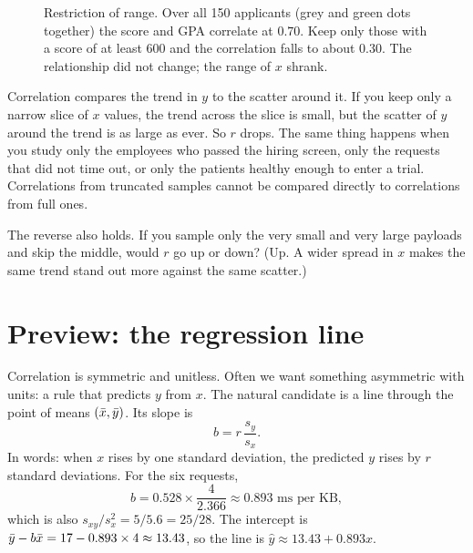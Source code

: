\begin{figure}[H]
\caption{Restriction of range. Over all 150 applicants (grey and green dots
together) the score and GPA correlate at $0.70$. Keep only those with a score of at least 600 and the correlation falls to
about $0.30$. The relationship did not change; the range of $x$ shrank.}
\label{fig:two-variables-range}
\end{figure}

Correlation compares the trend in $y$ to the scatter around it. If you keep only a
narrow slice of $x$ values, the trend across the slice is small, but the scatter
of $y$ around the trend is as large as ever. So $r$ drops. The same thing happens
when you study only the employees who passed the hiring screen, only the requests
that did not time out, or only the patients healthy enough to enter a trial.
Correlations from truncated samples cannot be compared directly to correlations
from full ones.

\begin{recoverybox}
The reverse also holds. If you sample only the very small and very large payloads
and skip the middle, would $r$ go up or down? (Up. A wider spread in $x$ makes the
same trend stand out more against the same scatter.)
\end{recoverybox}

\section{Preview: the regression line}
\label{sec:corr-regression-preview}

Correlation is symmetric and unitless. Often we want something asymmetric with
units: a rule that predicts $y$ from $x$. The natural candidate is a line through
the point of means $(\bar{x}, \bar{y})$. Its slope is
\[
  b = r \,\frac{s_y}{s_x}.
\]
In words: when $x$ rises by one standard deviation, the predicted $y$ rises by $r$
standard deviations. For the six requests,
\[
  b = 0.528 \times \frac{4}{2.366} \approx 0.893 \text{ ms per KB},
\]
which is also $s_{xy}/s_x^2 = 5/5.6 = 25/28$. The intercept is
$\bar{y} - b\bar{x} = 17 - 0.893 \times 4 \approx 13.43$, so the line is
$\hat y \approx 13.43 + 0.893x$.

